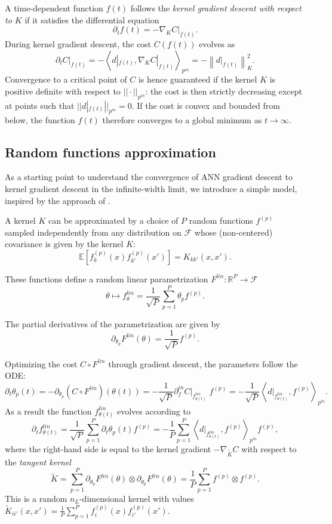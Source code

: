 A time-dependent function $ f (t) $ follows the \emph{kernel gradient descent with respect to $K$} if it satisfies the differential equation  
\[
	\partial_t f(t) = -\nabla_{K}C|_{f(t)}.
\] During kernel gradient descent, the cost $C(f(t))$ evolves as
\[
	\partial_t C|_{f(t)} = -\left<d|_{f(t)}, \nabla_{K}C|_{f(t)} \right>_{p^{in}}=-\left\|d|_{f(t)} \right\|_{K}^{2}.
\]
Convergence to a critical point of $C$ is hence guaranteed if the kernel $K$ is positive definite with respect to $|| \cdot ||_{p^{in}}$: the cost is then strictly decreasing except at points such that $||d|_{f(t)}||_{p^{in}} = 0$. If the cost is convex and bounded from below, the function $f(t)$ therefore converges to a global minimum as $t \to \infty$.

\subsection{Random functions approximation} \label{sec:rfa}
As a starting point to understand the convergence of ANN gradient descent to kernel gradient descent in the infinite-width limit, we introduce a simple model, inspired by the approach of \cite{Rahimi2007}. 

A kernel $K$ can be approximated by a choice of $P$ random functions $f^{(p)}$ sampled independently from any distribution on $\mathcal{F}$ whose (non-centered) covariance is given by the kernel $K$:
\[
\mathbb{E}[f_{k}^{(p)}(x)f_{k'}^{(p)}(x')]=K_{kk'}(x,x').
\]

These functions define a random linear parametrization $F^{lin}:\mathbb{R}^{P}\to\mathcal{F}$
\[
\theta \mapsto f_{\theta}^{lin}=\frac{1}{\sqrt{P}}\sum_{p=1}^{P}\theta_{p}f^{(p)}.
\]

The partial derivatives of the parametrization are given by 
\[
	\partial_{\theta_p} F^{lin}(\theta) = \frac{1}{\sqrt{P}} f^{(p)}.
\] 

Optimizing the cost $C\circ F^{lin}$ through gradient descent, the parameters follow the ODE:
\[
\partial_t  \theta_{p}(t)=-\partial_{\theta_{p}}(C\circ F^{lin})(\theta(t))=-\frac{1}{\sqrt{P}}\partial_{f}^{in}C|_{f_{\theta(t)}^{lin}}\;f^{(p)}=-\frac{1}{\sqrt{P}} \left<d|_{f_{\theta(t)}^{lin}}, f^{(p)}\right>_{p^{in}}.
\]
As a result the function $f_{\theta(t)}^{lin}$ evolves according to
\[
\partial_t f_{\theta(t)}^{lin}=\frac{1}{\sqrt{P}}\sum_{p=1}^{P} \partial_t \theta_{p}(t)f^{(p)}=-\frac{1}{P}\sum_{p=1}^{P}\left<d|_{f_{\theta(t)}^{lin}}, f^{(p)}\right>_{p^{in}} f^{(p)},
\]
where the right-hand side is equal to the kernel gradient $-\nabla_{\tilde{K}} C$ with respect to the \emph{tangent kernel} $$
\tilde{K} =\sum_{p=1}^P \partial_{\theta_p} F^{lin}(\theta) \otimes  \partial_{\theta_p} F^{lin}(\theta) = \frac{1}{P}\sum_{p=1}^P f^{(p)} \otimes f^{(p)}. $$ This is a random $n_L$-dimensional kernel with values $
\tilde{K}_{ii'}(x, x') = \frac{1}{P} \sum_{p=1}^P  f^{(p)}_i(x) f^{(p)}_{i'}(x'). $


